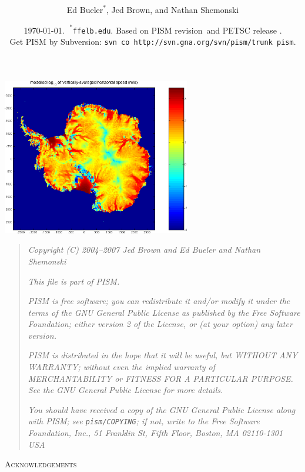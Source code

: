 \documentclass[11pt,final]{amsart}
\title[PISM User's Manual]{\protect{\Large PISM, a \underline{P}arallel \underline{I}ce \underline{S}heet \underline{M}odel:\normalsize} \\ \protect{\Large \bigskip \bigskip User's Manual\normalsize}}
\author[]{Ed $\text{Bueler}^\ast$, Jed Brown, and Nathan Shemonski}
\date{\today.  $\phantom{|}^\ast$\texttt{ffelb\@@uaf.edu}.  Based on PISM revision \PISMREV\,and PETSC release \PETSCREV.  \\\tiny Get PISM by Subversion: \texttt{svn co http://svn.gna.org/svn/pism/trunk pism}.}
\newcommand{\normalspacing}{\renewcommand{\baselinestretch}{1.1}\tiny\normalsize}
\newcommand{\tablespacing}{\renewcommand{\baselinestretch}{1.0}\tiny\normalsize}
\begin{document}
\maketitle
\thispagestyle{empty}

\vspace{2.0in}
\begin{center}
\includegraphics[height=2.7in,keepaspectratio=true]{figs/ant153k_mv100_speed}
\end{center}

\newpage
\phantom{bob}
\vspace{2in}
\begin{quote}
\textsl{Copyright (C) 2004--2007 Jed Brown and Ed Bueler and Nathan Shemonski}
\medskip

\noindent \textsl{This file is part of PISM.}
\medskip

\noindent \textsl{PISM is free software; you can redistribute it and/or modify it under the terms of the GNU General Public License as published by the Free Software Foundation; either version 2 of the License, or (at your option) any later version.}
\medskip

\noindent \textsl{PISM is distributed in the hope that it will be useful, but WITHOUT ANY WARRANTY; without even the implied warranty of MERCHANTABILITY or FITNESS FOR A PARTICULAR PURPOSE.  See the GNU General Public License for more details.}
\medskip

\noindent \textsl{You should have received a copy of the GNU General Public License along with PISM; see \emph{\texttt{pism/COPYING}}; if not, write to the Free Software Foundation, Inc., 51 Franklin St, Fifth Floor, Boston, MA  02110-1301 USA}
\end{quote}
\vspace{1in}
\normalspacing

\centerline{\textsc{Acknowledgements}}
\bigskip
\end{document}
